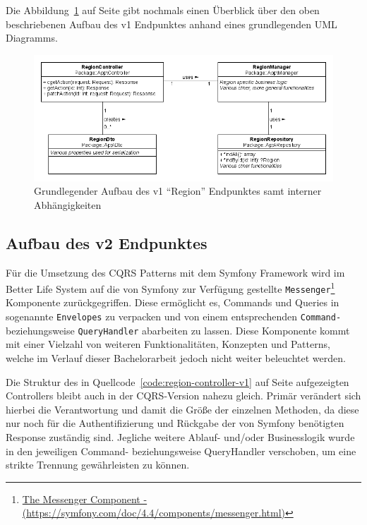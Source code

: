 \documentclass[a4paper,12pt,twoside]{scrreprt}
\begin{document}
\medskip

Die Abbildung~\ref{fig:region-v1-uml} auf Seite \pageref{fig:region-v1-uml} gibt nochmals einen Überblick über den oben beschriebenen Aufbau des v1 Endpunktes anhand eines grundlegenden UML Diagramms.

\begin{figure}[ht]
    \centering
    \includegraphics[scale=0.48]{images/region-v1-uml.png}
    \caption[UML Diagramm des v1 \enquote{Region} Endpunktes]{Grundlegender Aufbau des v1 \enquote{Region} Endpunktes samt interner Abhängigkeiten}
    \label{fig:region-v1-uml}
\end{figure}

\subsection{Aufbau des v2 Endpunktes}
\label{sub-sec:region-aufbau-v2}
Für die Umsetzung des CQRS Patterns mit dem Symfony Framework wird im Better Life System auf die von Symfony zur Verfügung gestellte \texttt{Messenger}\footnote{\href{https://symfony.com/doc/4.4/components/messenger.html}{The Messenger Component - (https://symfony.com/doc/4.4/components/messenger.html)}} Komponente zurückgegriffen. Diese ermöglicht es, Commands und Queries in sogenannte \texttt{Envelopes} zu verpacken und von einem entsprechenden \texttt{Command-} beziehungsweise \texttt{QueryHandler} abarbeiten zu lassen. Diese Komponente kommt mit einer Vielzahl von weiteren Funktionalitäten, Konzepten und Patterns, welche im Verlauf dieser Bachelorarbeit jedoch nicht weiter beleuchtet werden.

\clearpage

Die Struktur des in Quellcode~\ref{code:region-controller-v1} auf Seite \pageref{code:region-controller-v1} aufgezeigten Controllers bleibt auch in der CQRS-Version nahezu gleich. Primär verändert sich hierbei die Verantwortung und damit die Größe der einzelnen Methoden, da diese nur noch für die Authentifizierung und Rückgabe der von Symfony benötigten Response zuständig sind. Jegliche weitere Ablauf- und/oder Businesslogik wurde in den jeweiligen Command- beziehungsweise QueryHandler verschoben, um eine strikte Trennung gewährleisten zu können.
\end{document}
